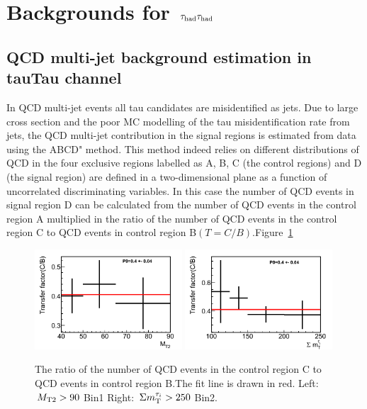 \section{\texorpdfstring{Backgrounds for $\,\tau_{\rm had}\tau_{\rm had}$}{Backgrounds for tauTau}}
\label{sect:bkg}
\subsection{QCD multi-jet background estimation in tauTau channel}
In QCD multi-jet events all tau candidates are misidentified as jets. Due to large cross
section and
the poor MC modelling of the tau misidentification rate from jets, the QCD multi-jet contribution in the signal regions is estimated from data using the ABCD" method.
This method indeed relies on different distributions of QCD
in the four exclusive regions labelled as A, B, C (the control regions) and D (the signal region) are defined in a two-dimensional plane as a function of uncorrelated discriminating variables.
In this case the number of QCD events in signal region D can be calculated from the number of QCD events in the control region A multiplied in the ratio of the number of QCD events in the control region C to QCD events in control region B$(T=C/B)$.Figure~\ref{fig:1QCDbg}
\begin{figure}[htbp]
\centering
\includegraphics[width=0.49\textwidth]{QCDbginTauTau/Bin1_transferfactor.png}
\includegraphics[width=0.49\textwidth]{QCDbginTauTau/Bin2_transferfactor.png} \\
\caption{The ratio of the number of QCD events in the control region C to QCD events in control region B.The
fit line is drawn in red.
Left: $\,{M_{\rm T2}}>90$ Bin1 Right: $\,\Sigma m_{\rm T}^{\tau_i} >250$ Bin2.}
\label{fig:1QCDbg}
\end{figure}
